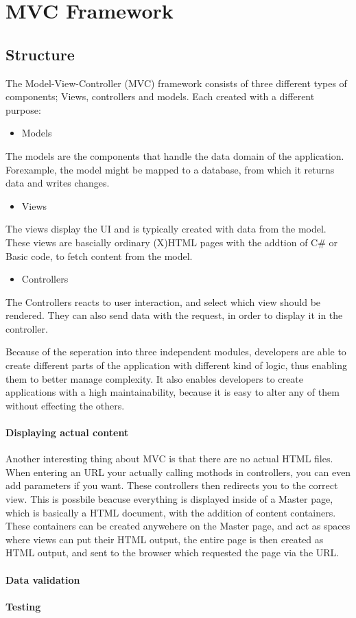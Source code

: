 \section{MVC Framework}
\label{sec:mvc}


\subsection{Structure}

The Model-View-Controller (MVC) framework consists of three different types of components; Views, controllers and models. Each created with a different purpose:

\begin{itemize}
\item Models
\end{itemize}
The models are the components that handle the data domain of the application. Forexample, the model might be mapped to a database, from which it returns data and writes changes.

\begin{itemize}
\item Views
\end{itemize}
The views display the UI and is typically created with data from the model. These views are bascially ordinary (X)HTML pages with the addtion of   C\# or Basic code, to fetch content from the model.

\begin{itemize}
\item Controllers
\end{itemize}
The Controllers reacts to user interaction, and select which view should be rendered. They can also send data with the request, in order to display it in the controller.

Because of the seperation into three independent modules, developers are able to create different parts of the application with different kind of logic, thus enabling them to better manage complexity. It also enables developers to create applications with a high maintainability, because it is easy to alter any of them without effecting the others.

\paragraph{Displaying actual content}
Another interesting thing about MVC is that there are no actual HTML files. When entering an URL your actually calling mothods in controllers, you can even add parameters if you want. These controllers then redirects you to the correct view. This is possbile beacuse everything is displayed inside of a Master page, which is basically a HTML document, with the addition of content containers. These containers can be created anywehere on the Master page, and act as spaces where views can put their HTML output, the entire page is then created as HTML output, and sent to the browser which requested the page via the URL.

\paragraph{Data validation}

\paragraph{Testing}
